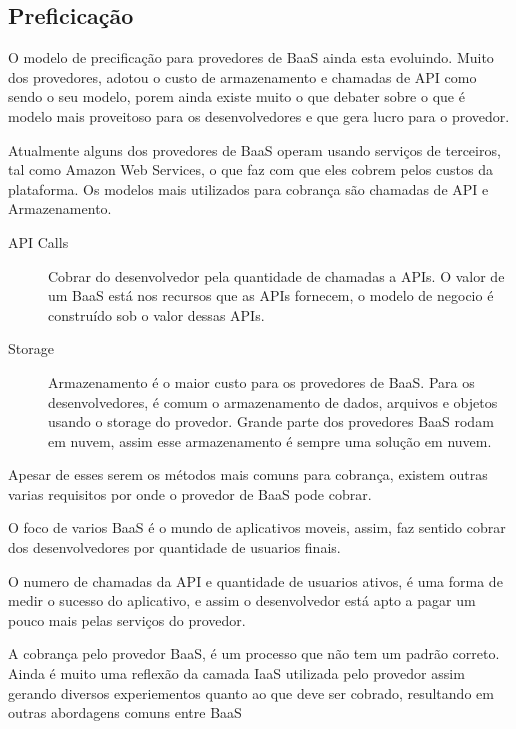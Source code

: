 	\subsection{Preficicação}
	O modelo de precificação para provedores de BaaS ainda esta evoluindo. Muito dos provedores, adotou o custo de armazenamento e chamadas de API como sendo o seu modelo, porem ainda existe muito o que debater sobre o que é modelo mais proveitoso para os desenvolvedores e que gera lucro para o provedor.

	Atualmente alguns dos provedores de BaaS operam usando serviços de terceiros, tal como Amazon Web Services, o que faz com que eles cobrem pelos custos da plataforma. Os modelos mais utilizados para cobrança são chamadas de API e Armazenamento.

	\begin{description}
		\item[]
		\item[API Calls]{ Cobrar do desenvolvedor pela quantidade de chamadas a APIs. O valor de um BaaS está nos recursos que as APIs fornecem, o modelo de negocio é construído sob o valor dessas APIs.}
		
		\item[Storage]{ Armazenamento é o maior custo para os provedores de BaaS. Para os desenvolvedores, é comum o armazenamento de dados, arquivos e objetos usando o storage do provedor. Grande parte dos provedores BaaS rodam em nuvem, assim esse armazenamento é sempre uma solução em nuvem. }
	\end{description}

	Apesar de esses serem os métodos mais comuns para cobrança, existem outras varias requisitos por onde o provedor de BaaS pode cobrar.


	O foco de varios BaaS é o mundo de aplicativos moveis, assim, faz sentido cobrar dos desenvolvedores por quantidade de usuarios finais.	

	
	O numero de chamadas da API e quantidade de usuarios ativos, é uma forma de medir o sucesso do aplicativo,  e assim o desenvolvedor está apto a pagar um pouco mais pelas serviços do provedor.

	A cobrança pelo provedor BaaS, é um processo que não tem um padrão correto. Ainda é muito uma reflexão da camada IaaS utilizada pelo provedor assim gerando diversos experiementos quanto ao que deve ser cobrado, resultando em outras abordagens comuns entre BaaS


